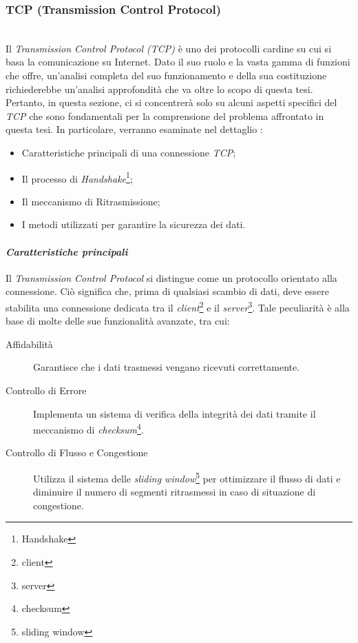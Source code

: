 \subsubsection{TCP (Transmission Control Protocol)}
~\\
\indent Il \emph{Transmission Control Protocol (TCP)} è uno dei protocolli cardine su cui si basa la comunicazione su Internet. 
Dato il suo ruolo e la vasta gamma di funzioni che offre, un'analisi completa del suo funzionamento e della sua costituzione richiederebbe un'analisi approfondità che va oltre lo scopo di questa tesi.
Pertanto, in questa sezione, ci si concentrerà solo su alcuni aspetti specifici del \emph{TCP} che sono fondamentali per la comprensione del problema affrontato in questa tesi. 
In particolare, verranno esaminate nel dettaglio :
\begin{itemize}
    \item Caratteristiche principali di una connessione \emph{TCP};
    
    \item Il processo di \emph{Handshake}\footnote{\gls{Handshake}};
    
    \item Il meccanismo di Ritrasmissione;
    
    \item I metodi utilizzati per garantire la sicurezza dei dati.
\end{itemize}

\paragraph{\textit{Caratteristiche principali}}
\noindent Il \emph{Transmission Control Protocol} si distingue come un protocollo orientato alla connessione. Ciò significa che, prima di qualsiasi scambio di dati, deve essere stabilita una connessione dedicata tra il \emph{client}\footnote{\gls{client}} e il \emph{server}\footnote{\gls{server}}.
Tale peculiarità è alla base di molte delle sue funzionalità avanzate, tra cui:
\begin{description}
    \item[Affidabilità] Garantisce che i dati trasmessi vengano ricevuti correttamente.

    \item[Controllo di Errore] Implementa un sistema di verifica della integrità dei dati tramite il meccanismo di \emph{checksum}\footnote{\gls{checksum}}.
    
    \item[Controllo di Flusso e Congestione] Utilizza il sistema delle \emph{sliding window}\footnote{\gls{sliding window}} per ottimizzare il flusso di dati e diminuire il numero di segmenti ritrasmessi in caso di situazione di congestione.
\end{description}


